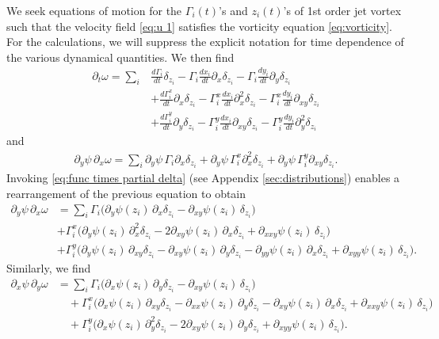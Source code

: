 \documentclass[12pt]{amsart}
\theoremstyle{remark}
\begin{document}
We seek equations of motion for the $\Gamma_i(t)$'s and $z_i(t)$'s of 1st order jet vortex
such that the velocity field \eqref{eq:u 1} satisfies the vorticity equation \eqref{eq:vorticity}.
For the calculations, we will suppress the explicit notation for time dependence of the various dynamical quantities.
We then find
\begin{align*}
  \partial_t \omega = \sum_{i} & \frac{d \Gamma_i}{dt} \delta_{z_i} 
  - \Gamma_i \frac{dx_i}{dt} \partial_x \delta_{z_i}
  - \Gamma_i \frac{dy_i}{dt} \partial_y \delta_{z_i} \\
  &+\frac{d \Gamma_i^x}{dt} \partial_x\delta_{z_i} 
  - \Gamma_i^x \frac{dx_i}{dt} \partial_x^2 \delta_{z_i}
  - \Gamma_i^x \frac{dy_i}{dt} \partial_{xy} \delta_{z_i} \\
  &+\frac{d \Gamma_i^y}{dt} \partial_y \delta_{z_i} 
  - \Gamma_i^y \frac{dx_i}{dt} \partial_{xy} \delta_{z_i}
  - \Gamma_i^y \frac{dy_i}{dt} \partial_y^2 \delta_{z_i}
\end{align*}
and
\begin{align*}
  \partial_y \psi \, \partial_x \omega = \sum_{i} \partial_y \psi \, \Gamma_i \partial_x \delta_{z_i}
  + \partial_y \psi \, \Gamma_i^x \partial_x^2 \delta_{z_i} 
  + \partial_y \psi \, \Gamma_i^y \partial_{xy} \delta_{z_i}.
\end{align*}
Invoking \eqref{eq:func times partial delta} (see Appendix
\ref{sec:distributions}) enables a rearrangement of the previous equation to
obtain
\begin{align*}
  \partial_y \psi \, \partial_x \omega &= \sum_{i} \Gamma_i \Big( \partial_y \psi (z_i) \, \partial_x \delta_{z_i} - \partial_{xy} \psi (z_i) \, \delta_{z_i} \Big) \\
   &+\Gamma_i^x \Big( \partial_y \psi(z_i)\, \partial_x^2 \delta_{z_i} 
   - 2\partial_{xy}\psi(z_i) \, \partial_x \delta_{z_i}
   + \partial_{xxy} \psi(z_i)\, \delta_{z_i} \Big) \\
   &+\Gamma_i^y \Big( \partial_y\psi(z_i)\, \partial_{xy} \delta_{z_i} 
   - \partial_{xy} \psi(z_i)\, \partial_y \delta_{z_i} 
   - \partial_{yy}\psi (z_i)\, \partial_x \delta_{z_i} 
   + \partial_{xyy} \psi(z_i)\, \delta_{z_i}\Big).
\end{align*}
Similarly, we find
\begin{align*}
    \partial_x \psi \, \partial_y \omega &= \sum_{i} \Gamma_i \Big( \partial_x \psi (z_i) \, \partial_y \delta_{z_i} - \partial_{xy}\psi(z_i)\, \delta_{z_i} \Big) \\
   &\quad + \Gamma_i^x \Big( \partial_x\psi(z_i) \,\partial_{xy} \delta_{z_i} 
   - \partial_{xx}\psi (z_i)\, \partial_y \delta_{z_i}
   - \partial_{xy} \psi(z_i)\, \partial_x \delta_{z_i}
   + \partial_{xxy} \psi(z_i)\, \delta_{z_i} \Big) \\
   &\quad + \Gamma_i^y \Big( \partial_x \psi(z_i) \,\partial_{y}^2 \delta_{z_i} 
   - 2\partial_{xy} \psi(z_i) \,\partial_y \delta_{z_i} 
   + \partial_{xyy} \psi(z_i) \, \delta_{z_i} \Big).
\end{align*}
\end{document}
